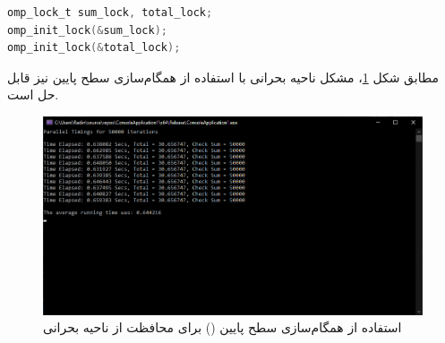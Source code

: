 \documentclass{HW}
\begin{document}
\begin{latin}
\begin{minipage}{\linewidth}
\begin{lstlisting}[language=C]
omp_lock_t sum_lock, total_lock;
omp_init_lock(&sum_lock);
omp_init_lock(&total_lock);
\end{lstlisting}
\end{minipage}
\end{latin}

مطابق شکل
\ref{fig:parallel-lock}،
مشکل ناحیه بحرانی با استفاده از همگام‌سازی سطح پایین نیز قابل حل است.

\begin{figure}[ht!]
\begin{center}
	\includegraphics[width=15cm]{images/parallel-lock}
\end{center}
\caption{استفاده از همگام‌سازی سطح پایین () برای محافظت از ناحیه بحرانی}
\label{fig:parallel-lock}
\end{figure}

\setcounter{mynumber}{1}
\begin{question}

\end{question}
\end{document}
